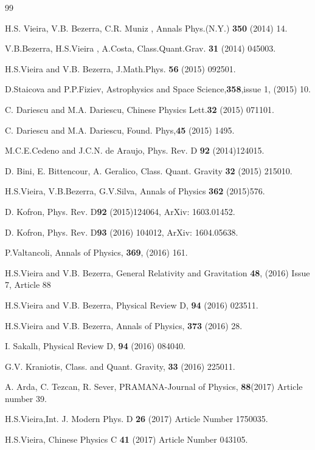 \documentclass{article}
\begin{document}
\begin{thebibliography}{99}
{{  H.S. Vieira, V.B. Bezerra, C.R. Muniz , Annals Phys.(N.Y.) \textbf{350} (2014) 14.

 V.B.Bezerra, H.S.Vieira , A.Costa, Class.Quant.Grav. \textbf{31} (2014) 045003.

 H.S.Vieira and V.B. Bezerra, J.Math.Phys. \textbf{56} (2015) 092501.

 D.Staicova and P.P.Fiziev, Astrophysics and Space Science,\textbf{358},issue 1, (2015) 10.

 C. Dariescu and M.A. Dariescu, Chinese Physics Lett.\textbf{32} (2015) 071101.

 C. Dariescu and M.A. Dariescu, Found.  Phys,\textbf{45} (2015) 1495.

 M.C.E.Cedeno and J.C.N. de Araujo, Phys. Rev. D
\textbf{92} (2014)124015.

 D. Bini, E. Bittencour, A. Geralico, Class. Quant.
Gravity \textbf{32} (2015) 215010.

 H.S.Vieira, V.B.Bezerra, G.V.Silva, Annals of
Physics \textbf{362} (2015)576.

 D. Kofron, Phys. Rev. D\textbf{92}
 (2015)124064, ArXiv: 1603.01452.

 D. Kofron, Phys. Rev. D\textbf{93} (2016) 104012,
ArXiv: 1604.05638.

 P.Valtancoli, Annals of Physics,
\textbf{369}, (2016) 161.

  H.S.Vieira and V.B. Bezerra, General
Relativity and Gravitation \textbf{48},  (2016) Issue 7, Article
88


  H.S.Vieira and V.B. Bezerra, Physical Review
D, \textbf{94} (2016) 023511.


  H.S.Vieira and V.B. Bezerra, Annals of
Physics, \textbf{373} (2016) 28.

 I. Sakall{\i}, Physical Review D, \textbf{94}
(2016) 084040.

 G.V. Kraniotis, Class. and Quant. Gravity,
\textbf{33} (2016) 225011.

 A. Arda, C. Tezcan, R. Sever, PRAMANA-Journal of Physics, \textbf{88}(2017) Article number 39.

 H.S.Vieira,Int. J. Modern Phys. D  \textbf{26}  (2017) Article Number 1750035.

  H.S.Vieira, Chinese Physics C \textbf{41} (2017) Article Number 043105.

}}
\end{thebibliography}
\end{document}

